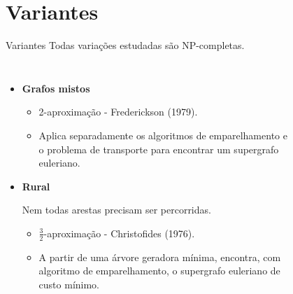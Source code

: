 \documentclass{beamer}
\begin{document}
\section{Variantes}

\begin{frame}{Variantes}
    Todas variações estudadas são NP-completas.

    \begin{columns}

        \begin{itemize}
            \item \textbf{Grafos mistos}
                \begin{itemize}
                    \item 2-aproximação - Frederickson (1979).
                    \item Aplica separadamente os algoritmos de emparelhamento e o problema de transporte para encontrar um supergrafo euleriano.
                \end{itemize}

            \item \textbf{Rural}

                Nem todas arestas precisam ser percorridas.
                \begin{itemize}
                    \item $\frac{3}{2}$-aproximação - Christofides (1976).  
                    \item A partir de uma árvore geradora mínima, encontra, com algoritmo de emparelhamento, o supergrafo euleriano de custo mínimo.
                \end{itemize}

        \end{itemize}


        \begin{figure}
            \centering
        \end{figure}
        

\end{columns}
\end{frame}
\end{document}
